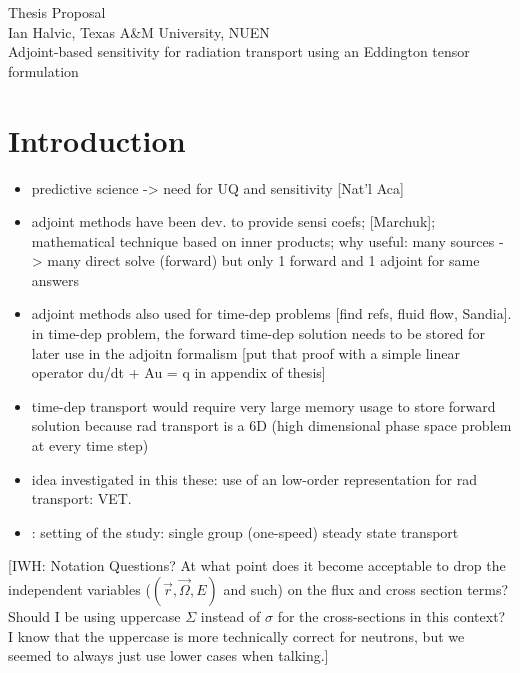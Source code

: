 \documentclass{article}
\newcommand{\vr}{\vec{r}}
\newcommand{\vO}{\vec{\Omega}}
\begin{document}
\begin{center}
{\large Thesis Proposal }\\
Ian Halvic, Texas A\&M University, NUEN \\
Adjoint-based sensitivity for radiation transport using an Eddington tensor formulation \\
\end{center}

\tableofcontents

\section{Introduction}
\begin{itemize}
\item predictive science -> need for UQ and sensitivity [Nat'l Aca]
\item adjoint methods have been dev. to provide sensi coefs; [Marchuk]; mathematical technique based on inner products; why useful: many sources -> many direct solve (forward) but only 1 forward and 1 adjoint for same answers
\item adjoint methods also used for time-dep problems [find refs, fluid flow, Sandia]. in time-dep problem, the forward time-dep solution needs to be stored for later use in the adjoitn formalism [put that proof with a simple linear operator du/dt + Au = q in appendix of thesis]
\item time-dep transport would require very large memory usage to store forward solution because rad transport is a 6D (high dimensional phase space problem at every time step)
\item idea investigated in this these: use of an low-order representation for rad transport: VET. 
\item: setting of the study: single group (one-speed) steady state transport 
\end{itemize}

{\color{red}[IWH: Notation Questions? At what point does it become acceptable to drop the independent variables ($(\vr,\vO,E)$ and such) on the flux and cross section terms? Should I be using uppercase $\Sigma$ instead of $\sigma$ for the cross-sections in this context? I know that the uppercase is more technically correct for neutrons, but we seemed to always just use lower cases when talking.]}
\end{document}
